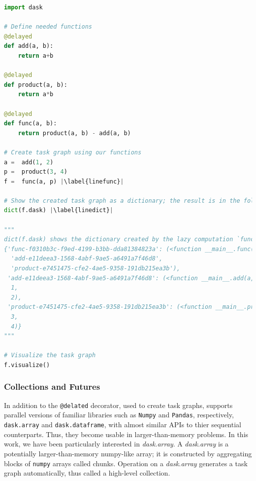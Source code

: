 \begin{lstlisting}[float=p, label=listdelayed, language=python, caption=Task graph creation with delayed]
import dask

# Define needed functions
@delayed
def add(a, b):
    return a+b

@delayed 
def product(a, b):
    return a*b

@delayed 
def func(a, b):
    return product(a, b) - add(a, b) 

# Create task graph using our functions 
a =  add(1, 2)
p =  product(3, 4)
f =  func(a, p) |\label{linefunc}|

# Show the created task graph as a dictionary; the result is in the following comment
dict(f.dask) |\label{linedict}|

"""
dict(f.dask) shows the dictionary created by the lazy computation `func` applied to `a` and `p` 
{'func-f0310b3c-f9ed-4199-b3bb-dda81384823a': (<function __main__.func(a, b)>,
  'add-e11deea3-1568-4abf-9ae5-a6491a7f46d8',
  'product-e7451475-cfe2-4ae5-9358-191db215ea3b'),
 'add-e11deea3-1568-4abf-9ae5-a6491a7f46d8': (<function __main__.add(a, b)>,
  1,
  2),
 'product-e7451475-cfe2-4ae5-9358-191db215ea3b': (<function __main__.product(a, b)>,
  3,
  4)}
"""

# Visualize the task graph
f.visualize()

\end{lstlisting}




\subsubsection{\dask Collections and Futures}
In addition to the \texttt{@delated} decorator, used to create task graphs, 
\dask supports parallel versions of familiar libraries such as \texttt{Numpy} and \texttt{Pandas}, respectively, \texttt{dask.array} and \texttt{dask.dataframe}, with almost similar APIs to thier sequential counterparts. 
Thus, they become usable in larger-than-memory problems. In this work, we have been particularly interested in \textit{dask.array}. 
A \textit{dask.array}\cite{rocklin_dask_2015} is a potentially larger-than-memory numpy-like array; it is constructed by aggregating blocks of \texttt{numpy} arrays called chunks. Operation on a \textit{dask.array} generates a task graph automatically, thus called a high-level collection.

